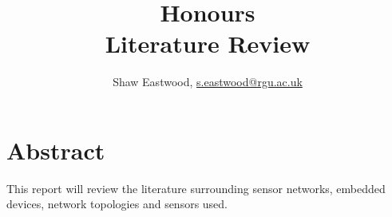 \documentclass{article}
\title{Honours \\ Literature Review}
\author{Shaw Eastwood, \url{s.eastwood@rgu.ac.uk}}
\begin{document}
\maketitle

\section{Abstract}
This report will review the literature surrounding sensor networks, embedded devices, network topologies and sensors used.








\end{document}

